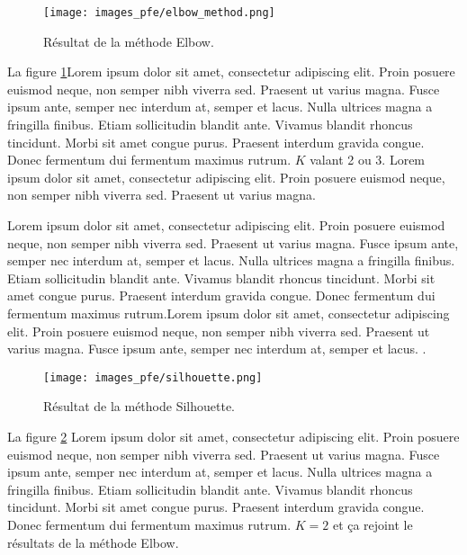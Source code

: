 \begin{figure}[hbt!]
  \centering
  \texttt{[image: images\_pfe/elbow\_method.png]}
  \caption{Résultat de la méthode Elbow.}
  \label{fig:elbow-method}
\end{figure}
\FloatBarrier

La figure \ref{fig:elbow-method}Lorem ipsum dolor sit amet, consectetur adipiscing elit. Proin posuere euismod neque, non semper nibh viverra sed. Praesent ut varius magna. Fusce ipsum ante, semper nec interdum at, semper et lacus. Nulla ultrices magna a fringilla finibus. Etiam sollicitudin blandit ante. Vivamus blandit rhoncus tincidunt. Morbi sit amet congue purus. Praesent interdum gravida congue. Donec fermentum dui fermentum maximus rutrum. $K$ valant 2 ou 3. Lorem ipsum dolor sit amet, consectetur adipiscing elit. Proin posuere euismod neque, non semper nibh viverra sed. Praesent ut varius magna. 

\medskip

Lorem ipsum dolor sit amet, consectetur adipiscing elit. Proin posuere euismod neque, non semper nibh viverra sed. Praesent ut varius magna. Fusce ipsum ante, semper nec interdum at, semper et lacus. Nulla ultrices magna a fringilla finibus. Etiam sollicitudin blandit ante. Vivamus blandit rhoncus tincidunt. Morbi sit amet congue purus. Praesent interdum gravida congue. Donec fermentum dui fermentum maximus rutrum.Lorem ipsum dolor sit amet, consectetur adipiscing elit. Proin posuere euismod neque, non semper nibh viverra sed. Praesent ut varius magna. Fusce ipsum ante, semper nec interdum at, semper et lacus. \parencite{kassambara_determining_nodate}.

\begin{figure}[hbt!]
  \centering
  \texttt{[image: images\_pfe/silhouette.png]}
  \caption{Résultat de la méthode Silhouette.}
  \label{fig:silhouette-method}
\end{figure}
\FloatBarrier

La figure \ref{fig:silhouette-method} Lorem ipsum dolor sit amet, consectetur adipiscing elit. Proin posuere euismod neque, non semper nibh viverra sed. Praesent ut varius magna. Fusce ipsum ante, semper nec interdum at, semper et lacus. Nulla ultrices magna a fringilla finibus. Etiam sollicitudin blandit ante. Vivamus blandit rhoncus tincidunt. Morbi sit amet congue purus. Praesent interdum gravida congue. Donec fermentum dui fermentum maximus rutrum. $K = 2$ et ça rejoint le résultats de la méthode Elbow.

\medskip

